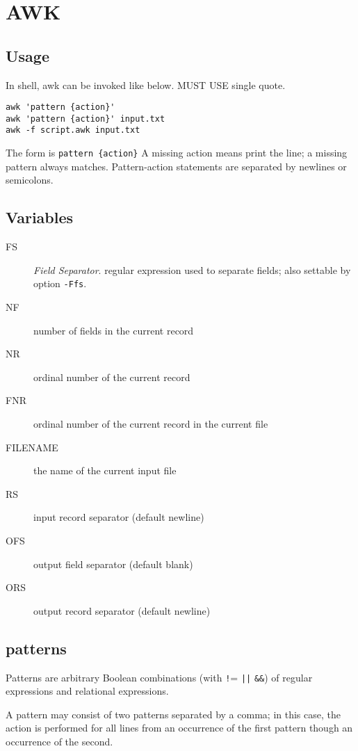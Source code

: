 \section{AWK}
\subsection{Usage}


In shell, awk can be invoked like below. MUST USE single quote.

\begin{lstlisting}
awk 'pattern {action}'
awk 'pattern {action}' input.txt
awk -f script.awk input.txt
\end{lstlisting}

The form is \verb$pattern {action}$
A missing action means print the line;
a missing pattern always matches.
Pattern-action statements are separated by newlines or semicolons.

\subsection{Variables}
\begin{description}
\item [FS] \textit{Field Separator}. regular expression used to
  separate fields; also settable by option \texttt{-Ffs}.
\item [NF] number of fields in the current record
\item [NR] ordinal number of the current record
\item [FNR] ordinal number of the current record in the current file
\item [FILENAME] the name of the current input file
\item [RS] input record separator (default newline)
\item [OFS] output field separator (default blank)
\item [ORS] output record separator (default newline)
\end{description}


\subsection{patterns}

Patterns are arbitrary Boolean combinations (with \verb$!$= \verb$||$ \verb$&&$)
of regular expressions and relational expressions.

A pattern may consist of two patterns separated by a comma; in this
case, the action is performed for all lines from an occurrence of the
first pattern though an occurrence of the second.

